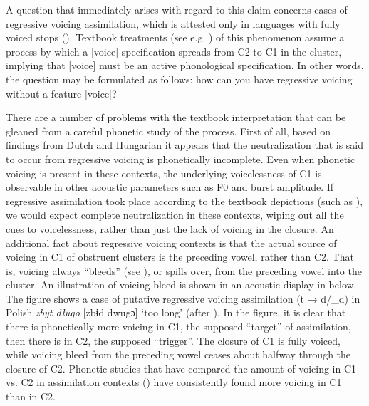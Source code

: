 \documentclass[output=paper]{langscibook}
\begin{document}
A question that immediately arises with regard to this claim concerns cases of regressive voicing assimilation, which is attested only in languages with fully voiced stops (\citealt{vanRooyWissing2001,WetzelsMascaro2001}). Textbook treatments (see e.g. \citealt{GussenhovenJacobs2017}) of this phenomenon assume a process by which a [voice] specification spreads from C2 to C1 in the cluster, implying that [voice] must be an active phonological specification. In other words, the question may be formulated as follows: how can you have regressive voicing without a feature [voice]?

There are a number of problems with the textbook interpretation that can be gleaned from a careful phonetic study of the process. First of all, based on findings from Dutch and Hungarian \citep{Jansen2004} it appears that the neutralization that is said to occur from regressive voicing is phonetically incomplete. Even when phonetic voicing is present in these contexts, the underlying voicelessness of C1 is observable in other acoustic parameters such as F0 and burst amplitude. If regressive assimilation took place according to the textbook depictions (such as \citealt{GussenhovenJacobs2017}), we would expect complete neutralization in these contexts, wiping out all the cues to voicelessness, rather than just the lack of voicing in the closure. An additional fact about regressive voicing contexts is that the actual source of voicing in C1 of obstruent clusters is the preceding vowel, rather than C2. That is, voicing always “bleeds” (see \citealt{Davidson2016}), or spills over, from the preceding vowel into the cluster. An illustration of voicing bleed is shown in an acoustic display in  below. The figure shows a case of putative regressive voicing assimilation (t → d/\_d) in Polish \textit{zbyt długo} [zbɨd dwugɔ] ‘too long’ (after \citealt{Schwartz2019}). In the figure, it is clear that there is phonetically more voicing in C1, the supposed “target” of assimilation, then there is in C2, the supposed “trigger”. The closure of C1 is fully voiced, while voicing bleed from the preceding vowel ceases about halfway through the closure of C2. Phonetic studies that have compared the amount of voicing in C1 vs. C2 in assimilation contexts (\citealt{HalléAdda-Decker2011,Schwartz2019}) have consistently found more voicing in C1 than in C2.
\end{document}
